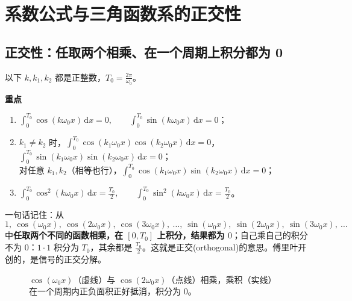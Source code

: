 \documentclass[UTF8,a4paper,11pt]{ctexart}
\newenvironment{remember}{\begin{rememberbox}\textbf{重点}\par\smallskip}{\end{rememberbox}}
\newcommand{\taxes}[5][t]{%
  \draw[->] (#2,0) -- (#3,0) node[right,font=\scriptsize] {$#1$};
  \draw[->] (0,#5) -- (0,#4);
  \node[anchor=north east,font=\tiny,gray!60!black,inner sep=1pt] at (0,-0.02) {$0$};}
\newcommand{\xt}[2]{\draw (#1,0) -- (#1,-0.1) node[anchor=north,font=\tiny,gray!60!black,fill=white,inner sep=0.6pt] {$#2$};}
\newcommand{\yt}[2]{\draw (0,#1) -- (-0.1,#1) node[anchor=east,font=\tiny,gray!60!black,fill=white,inner sep=0.6pt] {$#2$};}
\newcounter{ex}[section]
\begin{document}
\section{系数公式与三角函数系的正交性}\label{sec:coef}
\subsection{正交性：任取两个相乘、在一个周期上积分都为 0}
以下 $k,k_1,k_2$ 都是正整数，$T_0=\frac{2\pi}{\omega_0}$。
\begin{remember}
\begin{enumerate}[nosep]
\item $\displaystyle\int_0^{T_0}\cos(k\omega_0x)\,\mathrm{d}x=0,\qquad\int_0^{T_0}\sin(k\omega_0x)\,\mathrm{d}x=0$；
\item $k_1\ne k_2$ 时，$\displaystyle\int_0^{T_0}\cos(k_1\omega_0x)\cos(k_2\omega_0x)\,\mathrm{d}x=0$，$\displaystyle\int_0^{T_0}\sin(k_1\omega_0x)\sin(k_2\omega_0x)\,\mathrm{d}x=0$；\\
对任意 $k_1,k_2$（相等也行），$\displaystyle\int_0^{T_0}\cos(k_1\omega_0x)\sin(k_2\omega_0x)\,\mathrm{d}x=0$；
\item $\displaystyle\int_0^{T_0}\cos^2(k\omega_0x)\,\mathrm{d}x=\frac{T_0}{2},\qquad\int_0^{T_0}\sin^2(k\omega_0x)\,\mathrm{d}x=\frac{T_0}{2}$。
\end{enumerate}
一句话记住：从
\[
1,\ \cos(\omega_0x),\ \cos(2\omega_0x),\ \cos(3\omega_0x),\ \dots,\ \sin(\omega_0x),\ \sin(2\omega_0x),\ \sin(3\omega_0x),\ \dots
\]
中\textbf{任取两个不同的函数相乘，在 $[0,T_0]$ 上积分，结果都为 $0$}；自己乘自己的积分不为 $0$：$1\cdot1$ 积分为 $T_0$，其余都是 $\frac{T_0}{2}$。这就是正交(orthogonal)的意思。傅里叶开创的，是信号的正交分解。
\end{remember}

\begin{figure}[H]
\centering
{}
\caption{$\cos(\omega_0x)$（虚线）与 $\cos(2\omega_0x)$（点线）相乘，乘积（实线）在一个周期内正负面积正好抵消，积分为 $0$。}
\end{figure}
\end{document}
